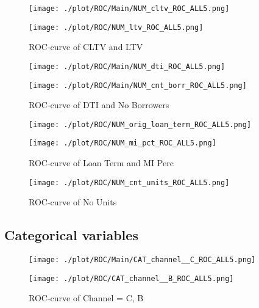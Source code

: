 \begin{figure}[H]
\begin{minipage}{.5\textwidth}
	\centering
	\texttt{[image: ./plot/ROC/Main/NUM\_cltv\_ROC\_ALL5.png]}
\end{minipage}%
\begin{minipage}{.5\textwidth}
	\centering
	\texttt{[image: ./plot/ROC/NUM\_ltv\_ROC\_ALL5.png]}
\end{minipage}
    \caption{ROC-curve of CLTV and LTV}
\end{figure}

\begin{figure}[H]
\begin{minipage}{.5\textwidth}
	\centering
	\texttt{[image: ./plot/ROC/Main/NUM\_dti\_ROC\_ALL5.png]}
\end{minipage}%
\begin{minipage}{.5\textwidth}
	\centering
	\texttt{[image: ./plot/ROC/Main/NUM\_cnt\_borr\_ROC\_ALL5.png]}
\end{minipage}
    \caption{ROC-curve of DTI and No Borrowers}
\end{figure}

\begin{figure}[H]
\begin{minipage}{.5\textwidth}
	\centering
	\texttt{[image: ./plot/ROC/NUM\_orig\_loan\_term\_ROC\_ALL5.png]}
\end{minipage}%
\begin{minipage}{.5\textwidth}
	\centering
	\texttt{[image: ./plot/ROC/NUM\_mi\_pct\_ROC\_ALL5.png]}
\end{minipage}
    \caption{ROC-curve of Loan Term and MI Perc}
\end{figure}

\begin{figure}[H]
	\centering
	\texttt{[image: ./plot/ROC/NUM\_cnt\_units\_ROC\_ALL5.png]}
    \caption{ROC-curve of No Units}
\end{figure}

\subsection{Categorical variables}

\begin{figure}[H]
\begin{minipage}{.5\textwidth}
	\centering
	\texttt{[image: ./plot/ROC/Main/CAT\_channel\_\_C\_ROC\_ALL5.png]}
\end{minipage}%
\begin{minipage}{.5\textwidth}
	\centering
	\texttt{[image: ./plot/ROC/CAT\_channel\_\_B\_ROC\_ALL5.png]}
\end{minipage}
    \caption{ROC-curve of Channel = C, B}
\end{figure}

